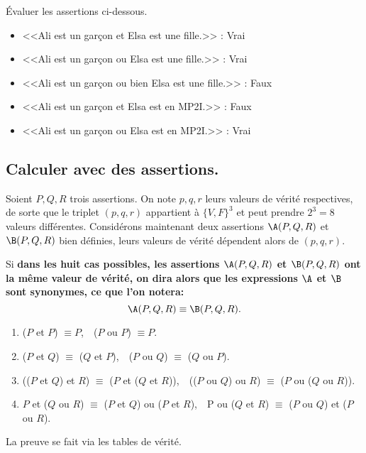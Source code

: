 \documentclass[11pt]{article}
\begin{document}
\begin{ex}{}{}
    Évaluer les assertions ci-dessous.
    \begin{itemize}[topsep=0pt,itemsep=-0.9 ex]
        \item <<Ali est un garçon et Elsa est une fille.>> : Vrai
        \item <<Ali est un garçon ou Elsa est une fille.>> : Vrai
        \item <<Ali est un garçon ou bien Elsa est une fille.>> : Faux
        \item <<Ali est un garçon et Elsa est en MP2I.>> : Faux
        \item <<Ali est un garçon ou Elsa est en MP2I.>> : Vrai
    \end{itemize}
\end{ex}

\pagebreak

\subsection{Calculer avec des assertions.}

Soient $P,Q,R$ trois assertions. On note $p,q,r$ leurs valeurs de vérité respectives, de sorte que le triplet $(p,q,r)$ appartient à $\{V,F\}^3$ et peut prendre $2^3=8$ valeurs différentes.\n
Considérons maintenant deux assertions $\A(P,Q,R)$ et $\B(P,Q,R)$ bien définies, leurs valeurs de vérité dépendent alors de $(p,q,r)$.
\vspace*{0.3cm}

\begin{nota}{}{}
    Si \bf{dans les huit cas possibles}, les assertions $\A(P,Q,R)$ et $\B(P,Q,R)$ ont la même valeur de vérité, on dira alors que les expressions $\A$ et $\B$ sont \bf{synonymes}, ce que l'on notera:
    \begin{equation*}
        \A(P,Q,R)\equiv\B(P,Q,R).
    \end{equation*} 
\end{nota}

\begin{prop}{}{}
    \begin{enumerate}[topsep=0pt,itemsep=-0.9 ex]
        \item ($P$ et $P$) $\equiv P$,$\quad$($P$ ou $P$) $\equiv P$.
        \item ($P$ et $Q$) $\equiv$ ($Q$ et $P$),$\quad$($P$ ou $Q$) $\equiv$ ($Q$ ou $P$).
        \item (($P$ et $Q$) et $R$) $\equiv$ ($P$ et ($Q$ et $R$)),$\quad$(($P$ ou $Q$) ou $R$) $\equiv$ ($P$ ou ($Q$ ou $R$)).
        \item $P$ et ($Q$ ou $R$) $\equiv$ ($P$ et $Q$) ou ($P$ et $R$),$\quad$P ou ($Q$ et $R$) $\equiv$ ($P$ ou $Q$) et ($P$ ou $R$).
    \end{enumerate}
    \tcblower
    La preuve se fait via les tables de vérité.
\end{prop}
\end{document}

